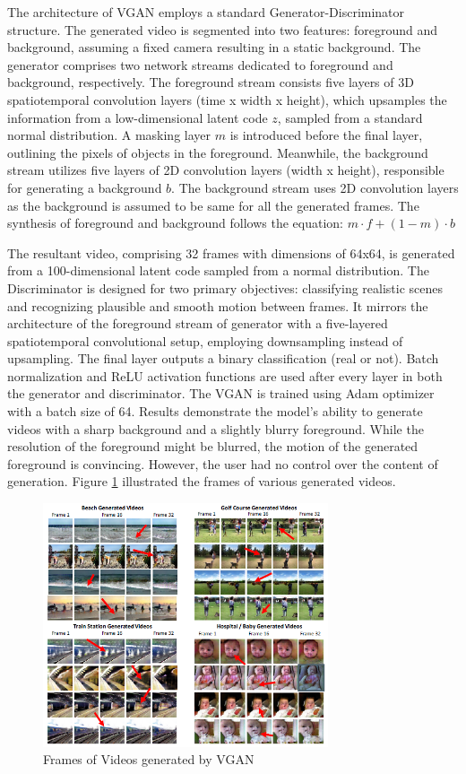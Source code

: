 \documentclass[12pt,twoside,a4paper,parskip]{scrbook} %
\begin{document}
The architecture of VGAN employs a standard Generator-Discriminator structure. The generated video is segmented into two features: foreground and background, assuming a fixed camera resulting in a static background. The generator comprises two network streams dedicated to foreground and background, respectively. The foreground stream consists five layers of 3D spatiotemporal convolution layers (time x width x height), which upsamples the information from a low-dimensional latent code $z$, sampled from a standard normal distribution. A masking layer $m$ is introduced before the final layer, outlining the pixels of objects in the foreground. Meanwhile, the background stream utilizes five layers of 2D convolution layers (width x height), responsible for generating a background $b$. The background stream uses 2D convolution layers as the background is assumed to be same for all the generated frames. The synthesis of foreground and background follows the equation: $m \cdot f + (1 - m) \cdot b$


The resultant video, comprising 32 frames with dimensions of 64x64, is generated from a 100-dimensional latent code sampled from a normal distribution. The Discriminator is designed for two primary objectives: classifying realistic scenes and recognizing plausible and smooth motion between frames. It mirrors the architecture of the foreground stream of generator with a five-layered spatiotemporal convolutional setup, employing downsampling instead of upsampling. The final layer outputs a binary classification (real or not). Batch normalization and ReLU activation functions are used after every layer in both the generator and discriminator. The VGAN is trained using Adam optimizer with a batch size of 64. Results demonstrate the model's ability to generate videos with a sharp background and a slightly blurry foreground. While the resolution of the foreground might be blurred, the motion of the generated foreground is convincing. However, the user had no control over the content of generation. Figure \ref{fig:vgan} illustrated the frames of various generated videos.

\begin{figure}[H]
    \centering
    \includegraphics[width=0.75\textwidth]{Images/vgan.png}
    \caption{Frames of Videos generated by VGAN}
    \label{fig:vgan}
  \end{figure}
\end{document}
